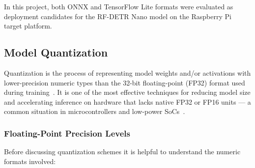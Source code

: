 In this project, both ONNX and TensorFlow Lite formats were evaluated
as deployment candidates for the RF-DETR Nano model on the Raspberry Pi
target platform.
 
\subsection{Model Quantization}
\label{sec:quantization}
 
Quantization is the process of representing model weights and/or
activations with lower-precision numeric types than the 32-bit
floating-point (FP32) format used during training~\cite{jacob2018quantization}.
It is one of the most effective techniques for reducing model size and
accelerating inference on hardware that lacks native FP32 or FP16
units — a common situation in microcontrollers and low-power
SoCs~\cite{krishnamoorthi2018quantizing}.
 
\subsubsection{Floating-Point Precision Levels}
 
Before discussing quantization schemes it is helpful to understand the
numeric formats involved:
 

